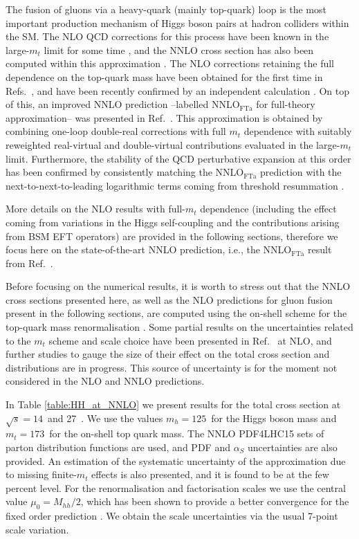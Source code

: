 \label{sec:HH_NNLO}

The fusion of gluons via a heavy-quark (mainly top-quark) loop is the most important production mechanism of Higgs boson pairs at hadron colliders within the SM.
The NLO QCD corrections for this process have been known in the large-$m_t$ limit for some time \cite{Dawson:1998py}, and the NNLO cross section has also been computed within this approximation \cite{deFlorian:2013jea}.
The NLO corrections retaining the full dependence on the top-quark mass have been obtained for the first time in Refs.~\cite{Borowka:2016ehy,Borowka:2016ypz}, and have been recently confirmed by an independent calculation \cite{Baglio:2018lrj}.
On top of this, an improved NNLO prediction --labelled NNLO$_{\mathrm{FTa}}$ for full-theory approximation-- was presented in Ref.~\cite{Grazzini:2018bsd}.
This approximation is obtained by combining one-loop double-real corrections with full $m_t$ dependence with suitably reweighted real-virtual and double-virtual contributions evaluated in the large-$m_t$ limit.
Furthermore, the stability of the QCD perturbative expansion at this order has been confirmed by consistently matching the NNLO$_{\mathrm{FTa}}$ prediction with the next-to-next-to-leading logarithmic terms coming from threshold resummation \cite{deFlorian:2018tah}.

More details on the NLO results with full-$m_t$ dependence (including the effect coming from variations in the Higgs self-coupling and the contributions arising from BSM EFT operators) are provided in the following sections, therefore we focus here on the state-of-the-art NNLO prediction, i.e., the NNLO$_{\mathrm{FTa}}$ result from Ref.~\cite{Grazzini:2018bsd}.

Before focusing on the numerical results, it is worth to stress out that the NNLO cross sections presented here, as well as the NLO predictions for gluon fusion present in the following sections, are computed using the on-shell scheme for the top-quark mass renormalisation .
Some partial results on the uncertainties related to the $m_t$ scheme and scale choice have been presented in Ref.~\cite{Baglio:2018lrj} at NLO, and further studies to gauge the size of their effect on the total cross section and distributions are in progress.
This source of uncertainty is for the moment not considered in the NLO and NNLO predictions.

In Table \ref{table:HH_at_NNLO} we present results for the total cross section at $\sqrt{s} = 14$~\UTeV and 27~\UTeV.
We use the values $m_h = 125$~\UGeV for the Higgs boson mass and $m_t = 173$~\UGeV for the  on-shell top quark mass.
The NNLO PDF4LHC15 sets of parton distribution functions are used, and PDF and $\alpha_S$ uncertainties are also provided.
An estimation of the systematic uncertainty of the approximation due to missing finite-$m_t$ effects is also presented, and it is found to be at the few percent level.
For the renormalisation  and factorisation scales we use the central value $\mu_0 = M_{hh}/2$, which has been shown to provide a better convergence for the fixed order prediction \cite{deFlorian:2018tah}. We obtain the scale uncertainties via the usual 7-point scale variation.

